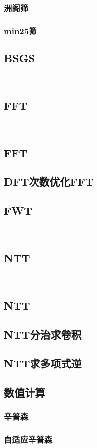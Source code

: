 \documentclass[twocolumn,a4]{article}
\newcommand{\addcpp}[1]{}
\begin{document}
		\subsubsection{洲阁筛}
		\subsubsection{min25筛}
	\subsection{BSGS}
		\addcpp{math/EXBSGS}
​	 \subsection{FFT}
​		 \subsection{FFT}
			\addcpp{math/FFT}
		\subsection{DFT次数优化FFT}
			\addcpp{math/FFT_2}
	\subsection{FWT}
​	 \subsection{NTT}
​		 \subsection{NTT}
			\addcpp{math/NTT}
		\subsection{NTT分治求卷积}
			\addcpp{math/NTT_cdq}
		\subsection{NTT求多项式逆}
			\addcpp{math/NTT_inv}
	\subsection{数值计算}
		\subsubsection{辛普森}
		\subsubsection{自适应辛普森}
			\addcpp{math/adaptive_simpson}
\end{document}
